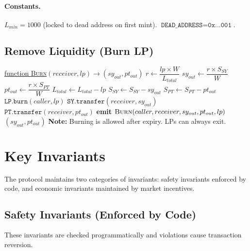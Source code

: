 \paragraph{Constants.}
$L_{min} = 1000$ (locked to dead address on first mint). $\texttt{DEAD\_ADDRESS} = \texttt{0x...001}$.

\subsection{Remove Liquidity (Burn LP)}

\begin{algorithm}[H]
\caption{Remove Liquidity}
\underline{function \textsc{Burn}}$(receiver, lp) \rightarrow (sy_{out}, pt_{out})$\;
\BlankLine
$r \gets \dfrac{lp \times W}{L_{total}}$\;
$sy_{out} \gets \dfrac{r \times S_{SY}}{W}$\;
$pt_{out} \gets \dfrac{r \times S_{PT}}{W}$\;
\BlankLine
$L_{total} \gets L_{total} - lp$\;
$S_{SY} \gets S_{SY} - sy_{out}$\;
$S_{PT} \gets S_{PT} - pt_{out}$\;
\BlankLine
$\texttt{LP.burn}(caller, lp)$\;
$\texttt{SY.transfer}(receiver, sy_{out})$\;
$\texttt{PT.transfer}(receiver, pt_{out})$\;
\BlankLine
\textbf{emit} $\textsc{Burn}(caller, receiver, sy_{out}, pt_{out}, lp)$\;
\Return $(sy_{out}, pt_{out})$\;
\BlankLine
\textbf{Note:} Burning is allowed after expiry. LPs can always exit.\;
\end{algorithm}

\section{Key Invariants}

The protocol maintains two categories of invariants: safety invariants enforced by code, and economic invariants maintained by market incentives.

\subsection{Safety Invariants (Enforced by Code)}

These invariants are checked programmatically and violations cause transaction reversion.

